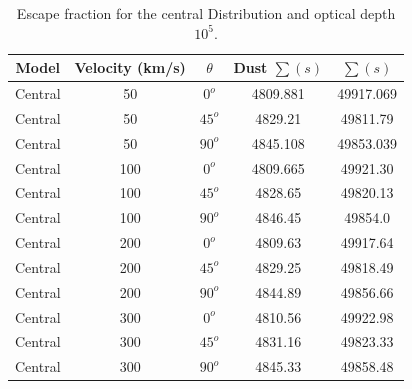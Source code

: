 \documentclass[usenatbib]{mn2e}
\begin{document}
\begin{table}
\begin{center}
\begin{tabular}{ccccc} \hline 
Model & Velocity (km/s) & $\theta$ & Dust $\sum (s)$& $\sum (s)$ \\  \hline 
Central & 50 & $0^{o}$ & 4809.881 & 49917.069 \\ 
Central & 50 & $45^{o}$ & 4829.21 & 49811.79 \\ 
Central & 50 & $90^{o}$ & 4845.108 & 49853.039\\ 
Central & 100 & $0^{o}$ & 4809.665 & 49921.30 \\  
Central & 100 & $45^{o}$ & 4828.65 & 49820.13 \\ 
Central & 100 & $90^{o}$ & 4846.45 & 49854.0 \\ 
Central & 200 & $0^{o}$  & 4809.63 & 49917.64 \\ 
Central & 200 & $45^{o}$ & 4829.25 & 49818.49 \\ 
Central & 200 & $90^{o}$ & 4844.89 & 49856.66 \\ 
Central & 300 & $ 0^{o}$ & 4810.56 & 49922.98\\ 
Central & 300 & $45^{o}$ & 4831.16 & 49823.33\\ 
Central & 300 & $90^{o}$ & 4845.33 & 49858.48\\ \hline
\end{tabular}
\caption{Escape fraction for the central Distribution and optical depth $10^{5}$.} 
\end{center}
\end{table}




\end{document}
